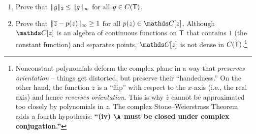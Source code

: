 \documentclass{../homework}
\begin{document}
\begin{Exercise}
\begin{enumerate}
  \item Prove that $\lVert {g} \rVert_2 \leq \lVert {g} \rVert_{\infty}$ for all
    $g \in C(\mathsf{T})$.

    \begin{solution}

    \end{solution}

  \item Prove that $\lVert {\overline{z} - p(z)} \rVert_{\infty} \geq 1$ for
    all $p(z) \in \C[z]$.  Although $\C[z]$ is an algebra of
    continuous functions on $\mathsf{T}$ that contains $1$ (the constant
    function) and separates points, $\C[z]$ is not dense in
    $C(\mathsf{T})$.\footnote{Nonconstant polynomials deform the complex plane
      in a way that \emph{preserves orientation} -- things get
      distorted, but preserve their ``handedness.''  On the other
      hand, the function $\overline{z}$ is a ``flip'' with respect to
      the $x$-axis (i.e., the real axis) and hence \emph{reverses
        orientation}.  This is why $\overline{z}$ cannot be
      approximated too closely by polynomials in $z$.  The complex
      Stone--Weierstrass Theorem adds a fourth hypothesis:
      \textbf{``(iv) $\A$ must be closed under complex
        conjugation.''}}

    \begin{solution}

    \end{solution}
	\end{enumerate}
\end{Exercise}
\end{document}
